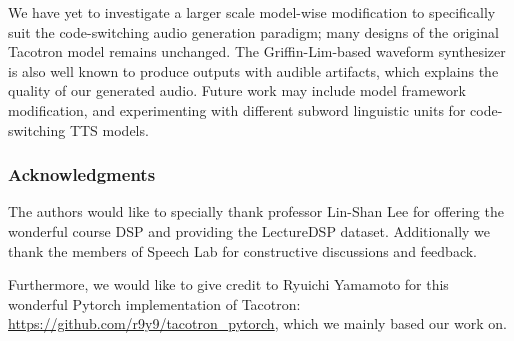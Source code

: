 \documentclass{article} %
\begin{document}
\begin{CJK}{UTF8}{bsmi}
We have yet to investigate a larger scale model-wise modification to specifically suit the code-switching audio generation paradigm; many designs of the original Tacotron model remains unchanged. The Griffin-Lim-based waveform synthesizer is also well known to produce outputs with audible artifacts, which explains the quality of our generated audio. Future work may include model framework modification, and experimenting with different subword linguistic units for code-switching TTS models.

\subsubsection*{Acknowledgments}
The authors would like to specially thank professor Lin-Shan Lee for offering the wonderful course DSP and providing the LectureDSP dataset. Additionally we thank the members of Speech Lab for constructive discussions and feedback.

Furthermore, we would like to give credit to Ryuichi Yamamoto for this wonderful Pytorch implementation of Tacotron: \url{https://github.com/r9y9/tacotron_pytorch}, which we mainly based our work on.




\end{CJK}
\end{document}
